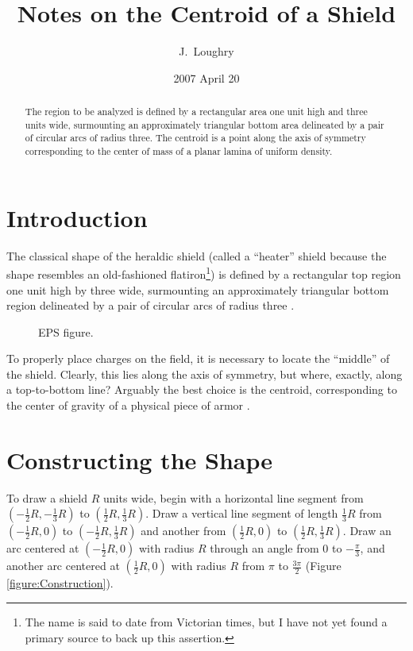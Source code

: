 \documentclass{article}
\title{Notes on the Centroid of a Shield}
\author{J.\ Loughry}
\date{2007 April 20}
\begin{document}
\maketitle

\begin{abstract}

The region to be analyzed is defined by a rectangular area one unit high
and three units wide, surmounting an approximately triangular bottom area
delineated by a pair of circular arcs of radius three.  The centroid is a
point along the axis of symmetry corresponding to the center of mass of a
planar lamina of uniform density.

\end{abstract}

\section{Introduction}

The classical shape of the heraldic shield (called a ``heater'' shield because
the shape resembles an old-fashioned flatiron\footnote{The name is said to
date from Victorian times\cite{heater-shield-victorian-curators},
but I have not yet found a primary source to back up this assertion.})
is defined by a rectangular top region one unit high
by three wide, surmounting an approximately
triangular bottom region delineated by a pair of circular arcs of radius
three \cite{classical_heraldry}.

\begin{figure}[htbp]
  \centering
  \caption{EPS figure.}
  \label{figure:eps-figure}
\end{figure}

To properly place charges on the field, it is necessary to locate the ``middle''
of the shield.  Clearly, this lies along the axis of symmetry, but where,
exactly, along a top-to-bottom line?  Arguably the best choice is the centroid,
corresponding to the center of gravity of a physical piece of armor \cite{apostol:finding-centroids}.

\section{Constructing the Shape}

To draw a shield $R$ units wide, begin with a horizontal line segment from
$(-\frac{1}{2}R,-\frac{1}{3}R)$ to $(\frac{1}{2}R,\frac{1}{3}R)$.  Draw a
vertical line segment of length $\frac{1}{3}R$ from
$(-\frac{1}{2}R,0)$ to $(-\frac{1}{2}R,\frac{1}{3}R)$ and
another from $(\frac{1}{2}R,0)$ to $(\frac{1}{2}R,\frac{1}{3}R)$.  Draw an arc
centered at $(-\frac{1}{2}R,0)$ with radius $R$ through an angle from $0$ to
$-\frac{\pi}{3}$, and another arc centered at $(\frac{1}{2}R,0)$ with radius $R$ from
$\pi$ to $\frac{3\pi}{2}$ (Figure \ref{figure:Construction}).
\end{document}
